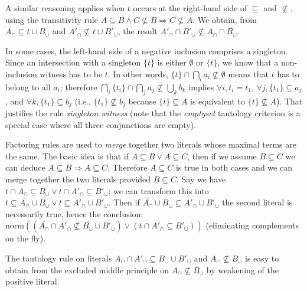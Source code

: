 \documentclass{article}
\newcommand{\compl}[1]{\ensuremath{\overline{#1}}}
\newcommand{\normalize}[1]{\ensuremath{\text{norm}(#1)}}
\begin{document}
A similar reasoning applies when $t$ occurs at the right-hand side of
$\subseteq$ and $\not\subseteq$, using the transitivity rule
$A \subseteq B \land C \not\subseteq B \Rightarrow C \not\subseteq A$. We
obtain, from $A_\cap \subseteq t\cup B_\cup$ and
$A'_\cap \not\subseteq t\cup B'_\cup$, the result
$A'_\cap \cap \compl{B'_\cup} \not\subseteq A_\cap \cap \compl{B_\cup}$.

In some cases, the left-hand side of a negative inclusion comprises
a singleton. Since an intersection with a singleton $\{ t \}$ is either
$\emptyset$ or $\{ t\}$, we know that a non-inclusion witness has to be $t$.
In other words, $\{ t \} \cap \bigcap_i a_i \not\subseteq \emptyset$
means that $t$ has to belong to all $a_i$; therefore
$\bigcap_i \{ t_i \} \cap \bigcap_j a_j \not\subseteq \bigcup_k b_k$
implies $\forall i, t_i = t_1$,
$\forall j, \{ t_1 \} \subseteq a_j$, and
$\forall k, \{ t_1 \} \subseteq \compl{b_j}$ (i.e.,
$\{ t_1 \} \not\subseteq b_j$ because $\{ t\} \subseteq \compl{A}$
is equivalent to $\{t \} \not\subseteq A$).
That justifies the rule \emph{singleton witness} (note that the \emph{emptyset}
tautology criterion is a special case where all three conjunctions are empty).

Factoring rules are used to \emph{merge} together two literals whose maximal
terms are the same. The basic idea is that if $A \subseteq B
\lor A \subseteq C$, then if we assume $B\subseteq C$ we can deduce
$A \subseteq B \Rightarrow A \subseteq C$. Therefore $A\subseteq C$ is true
in both cases and we can merge together the two literals provided $B\subseteq C$.
Say we have
$t \cap A_\cap \subseteq B_\cup \lor t \cap A'_\cap \subseteq B'_\cup$; we
can transform this into
$t \subseteq \compl{A_\cap} \cup B_\cup \lor t \subseteq \compl{A'_\cap} \cup B'_\cup$.
Then if $\compl{A_\cap} \cup B_\cup \subseteq \compl{A'_\cap} \cup B'_\cup$
the second literal is necessarily true, hence the conclusion:
$\normalize{(\compl{A_\cap} \cap A'_\cap \not\subseteq \compl{B_\cup} \cup B'_\cup) 
    \lor (t \cap A'_\cap \subseteq B'_\cup)}$ (eliminating complements
on the fly).

The tautology rule on literals
$A_\cap \cap A'_\cap \subseteq B_\cup \cup B'_\cup$
and $A_\cap \not\subseteq B_\cup$
is easy to obtain from the excluded middle principle on
$A_\cap \not\subseteq B_\cup$ by weakening of the positive literal.
\end{document}
